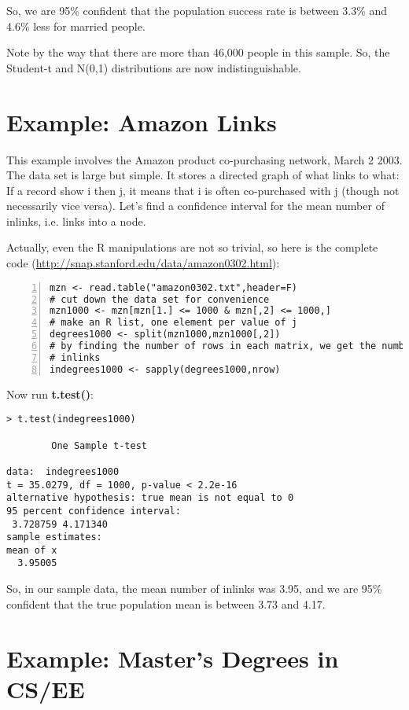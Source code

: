 So, we are 95\% confident that the population success
rate is between 3.3\% and 4.6\% less for married people.

Note by the way that there are more than 46,000 people in this sample.
So, the Student-t and N(0,1) distributions are now indistinguishable.

\section{Example:  Amazon Links}

This example involves the Amazon product co-purchasing network, March 2
2003.  The data set is large but simple. It stores a directed graph of
what links to what: If a record show i then j, it means that i is often
co-purchased with j (though not necessarily vice versa).  Let's find a
confidence interval for the mean number of inlinks, i.e. links into a
node.

Actually, even the R manipulations are not so trivial, so here is the
complete code (\url{http://snap.stanford.edu/data/amazon0302.html}):

\begin{lstlisting}[numbers=left]
mzn <- read.table("amazon0302.txt",header=F)
# cut down the data set for convenience
mzn1000 <- mzn[mzn[1.] <= 1000 & mzn[,2] <= 1000,]
# make an R list, one element per value of j
degrees1000 <- split(mzn1000,mzn1000[,2])
# by finding the number of rows in each matrix, we get the numbers of
# inlinks
indegrees1000 <- sapply(degrees1000,nrow)
\end{lstlisting}

Now run {\bf t.test()}:

\begin{lstlisting}
> t.test(indegrees1000)

        One Sample t-test

data:  indegrees1000 
t = 35.0279, df = 1000, p-value < 2.2e-16
alternative hypothesis: true mean is not equal to 0 
95 percent confidence interval:
 3.728759 4.171340 
sample estimates:
mean of x 
  3.95005 
\end{lstlisting}

So, in our sample data, the mean number of inlinks was 3.95, and we are
95\% confident that the true population mean is between 3.73 and 4.17.

\section{Example:  Master's Degrees in CS/EE}

